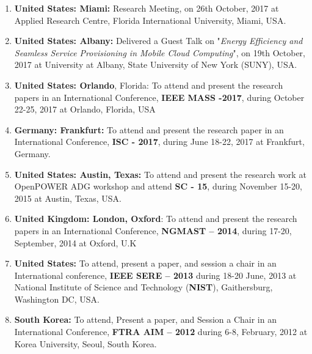 \begin{enumerate}

\item
\textbf{United States: Miami:} Research Meeting, on 26th October, 2017 at Applied Research Centre, Florida International University, Miami, USA. 

\item
\textbf{United States: Albany:} Delivered a Guest Talk on "\textit{Energy Efficiency and Seamless Service Provisioning in Mobile Cloud Computing}", on 19th October, 2017 at University at Albany, State University of New York (SUNY), USA. 

\item
\textbf{United States: Orlando}, Florida: To attend and present the research papers in an International Conference, \textbf{IEEE MASS -2017}, during October 22-25, 2017 at Orlando, Florida, USA

\item
\textbf{Germany: Frankfurt:} To attend and present the research paper in an International Conference, \textbf{ISC - 2017}, during June 18-22, 2017 at Frankfurt, Germany.

\item
\textbf{United States: Austin, Texas:} To attend and present the research work at OpenPOWER ADG workshop and attend \textbf{SC - 15}, during November 15-20, 2015 at Austin, Texas, USA.

\item
\textbf{United Kingdom: London, Oxford}: To attend and present the research papers in an International Conference, \textbf{NGMAST – 2014}, during 17-20, September, 2014 at Oxford, U.K

\item
\textbf{United States:} To attend, present a paper, and session a chair in an International conference, \textbf{IEEE SERE – 2013} during 18-20 June, 2013 at National Institute of Science and Technology (\textbf{NIST}), Gaithersburg, Washington DC, USA.

\item
\textbf{South Korea:} To attend, Present a paper, and Session a Chair in an International Conference, \textbf{FTRA AIM – 2012} during 6-8, February, 2012 at Korea University, Seoul, South Korea.
	

\end{enumerate}